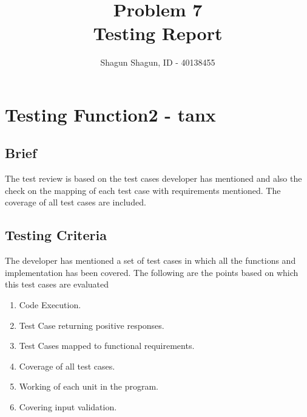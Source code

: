 \documentclass[a4paper,12pt]{article}
\title{Problem 7\\
\large Testing Report}
\author{Shagun Shagun, ID - 40138455}
\date{}
\begin{document}
\maketitle %
\maketitle
\section{Testing Function2 - tanx}
    \subsection{Brief}
   The test review is based on the test cases developer has mentioned and also the check on the  mapping of each test case with requirements mentioned. The coverage of all test cases are included.
    \subsection{Testing Criteria}
    The developer has mentioned a set of test cases in which all the functions and implementation has been covered. The following are the points based on which this test cases are evaluated
    \begin{enumerate}
        \item Code Execution.
        \item Test Case returning positive responses.
        \item Test Cases mapped to functional requirements.
        \item Coverage of all test cases.
        \item Working of each unit in the program.
        \item Covering input validation.
    \end{enumerate}
    
\end{document}
